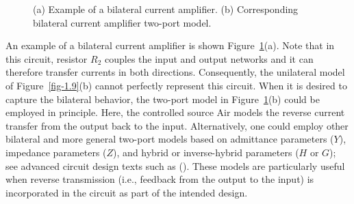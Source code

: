 \documentclass[
  11pt,
  letterpaper,
  abstract]{scrbook}
\begin{document}
\begin{figure}


\caption{\label{fig-1.12}(a) Example of a bilateral current amplifier.
(b) Corresponding bilateral current amplifier two-port model.}

\end{figure}%

An example of a bilateral current amplifier is shown
Figure~\ref{fig-1.12}(a). Note that in this circuit, resistor \(R_2\)
couples the input and output networks and it can therefore transfer
currents in both directions. Consequently, the unilateral model of
Figure~\ref{fig-1.9}(b) cannot perfectly represent this circuit. When it
is desired to capture the bilateral behavior, the two-port model in
Figure~\ref{fig-1.12}(b) could be employed in principle. Here, the
controlled source Air models the reverse current transfer from the
output back to the input. Alternatively, one could employ other
bilateral and more general two-port models based on admittance
parameters (\(Y\)), impedance parameters (\(Z\)), and hybrid or
inverse-hybrid parameters (\(H\) or \(G\)); see advanced circuit design
texts such as (). These
models are particularly useful when reverse transmission (i.e., feedback
from the output to the input) is incorporated in the circuit as part of
the intended design.
\end{document}

